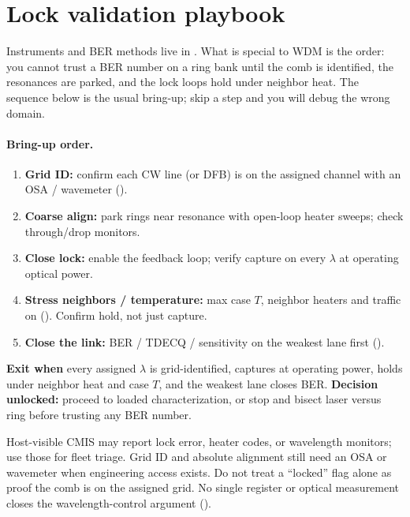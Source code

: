 \section{Lock validation playbook}
\label{sec:lock-validation}

Instruments and BER methods live in . What is special to WDM
is the order: you cannot trust a BER number on a ring bank until the comb is
identified, the resonances are parked, and the lock loops hold under neighbor
heat. The sequence below is the usual bring-up; skip a step and you will debug
the wrong domain.

\paragraph{Bring-up order.}
\begin{enumerate}
\item \textbf{Grid ID:} confirm each CW line (or DFB) is on the assigned channel
      with an OSA / wavemeter ().
\item \textbf{Coarse align:} park rings near resonance with open-loop heater
      sweeps; check through/drop monitors.
\item \textbf{Close lock:} enable the feedback loop; verify capture on every
      $\lambda$ at operating optical power.
\item \textbf{Stress neighbors / temperature:} max case $T$, neighbor heaters and
      traffic on (). Confirm hold, not
      just capture.
\item \textbf{Close the link:} BER / TDECQ / sensitivity on the weakest lane
      first ().
\end{enumerate}

\textbf{Exit when} every assigned $\lambda$ is grid-identified, captures at
operating power, holds under neighbor heat and case $T$, and the weakest lane
closes BER. \textbf{Decision unlocked:} proceed to loaded characterization, or
stop and bisect laser versus ring before trusting any BER number.

Host-visible CMIS may report lock error, heater codes, or wavelength monitors;
use those for fleet triage. Grid ID and absolute alignment still need an OSA
or wavemeter when engineering access exists. Do not treat a ``locked'' flag
alone as proof the comb is on the assigned grid. No single register or optical
measurement closes the wavelength-control argument ().

